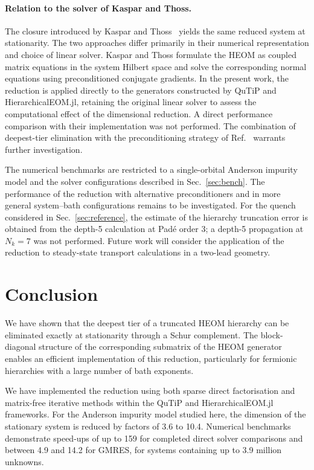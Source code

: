 \documentclass[11pt,a4paper]{article}
\begin{document}
\paragraph{Relation to the solver of Kaspar and Thoss.}
The closure introduced by Kaspar and Thoss~\cite{KasparThoss2021} yields the
same reduced system at stationarity. The two approaches differ primarily in
their numerical representation and choice of linear solver. Kaspar and Thoss
formulate the HEOM as coupled matrix equations in the system Hilbert space and
solve the corresponding normal equations using preconditioned conjugate
gradients. In the present work, the reduction is applied directly to the
generators constructed by QuTiP and HierarchicalEOM.jl, retaining the original
linear solver to assess the computational effect of the dimensional reduction.
A direct performance comparison with their implementation was not performed.
The combination of deepest-tier elimination with the preconditioning strategy
of Ref.~\cite{KasparThoss2021} warrants further investigation.

The numerical benchmarks are restricted to a single-orbital Anderson impurity
model and the solver configurations described in Sec.~\ref{sec:bench}. The
performance of the reduction with alternative preconditioners and in more
general system--bath configurations remains to be investigated. For the quench
considered in Sec.~\ref{sec:reference}, the estimate of the hierarchy truncation
error is obtained from the depth-5 calculation at Padé order 3; a depth-5
propagation at $N_k = 7$ was not performed. Future work will consider the
application of the reduction to steady-state transport calculations in a
two-lead geometry.

\section{Conclusion}

We have shown that the deepest tier of a truncated HEOM hierarchy can be
eliminated exactly at stationarity through a Schur complement. The
block-diagonal structure of the corresponding submatrix of the HEOM generator
enables an efficient implementation of this reduction, particularly for
fermionic hierarchies with a large number of bath exponents.

We have implemented the reduction using both sparse direct factorisation and
matrix-free iterative methods within the QuTiP and HierarchicalEOM.jl
frameworks. For the Anderson impurity model studied here, the dimension of the
stationary system is reduced by factors of 3.6 to 10.4. Numerical benchmarks
demonstrate speed-ups of up to 159 for completed direct solver comparisons and between 4.9 and
14.2 for GMRES, for systems containing up to 3.9 million unknowns.
\end{document}
